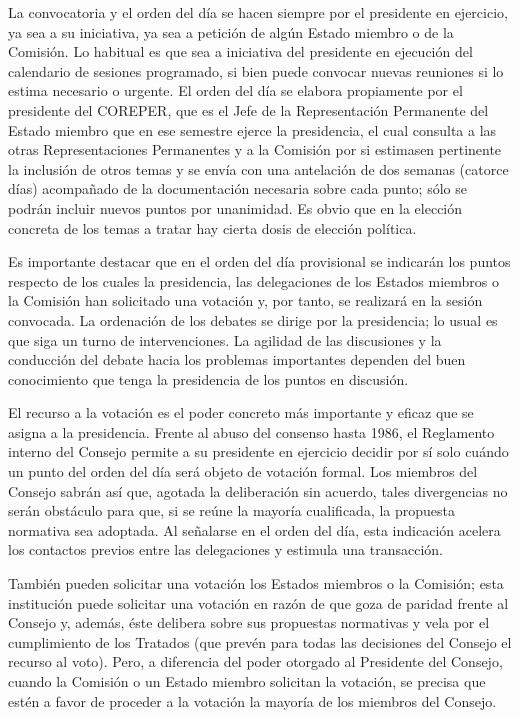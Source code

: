 \documentclass[10pt,a4paper]{article}
\begin{document}
La convocatoria y el orden del día se hacen siempre por el presidente en ejercicio, ya sea a su iniciativa, ya sea a petición de algún Estado miembro o de la Comisión. Lo habitual es que sea a iniciativa del presidente en ejecución del calendario de sesiones programado, si bien puede convocar nuevas reuniones si lo estima necesario o urgente. El orden del día se elabora propiamente por el presidente del COREPER, que es el Jefe de la Representación Permanente del Estado miembro que en ese semestre ejerce la presidencia, el cual consulta a las otras Representaciones Permanentes y a la Comisión por si estimasen pertinente la inclusión de otros temas y se envía con una antelación de dos semanas (catorce días) acompañado de la documentación necesaria sobre cada punto; sólo se podrán incluir nuevos puntos por unanimidad. Es obvio que en la elección concreta de los temas a tratar hay cierta dosis de elección política.

Es importante destacar que en el orden del día provisional se indicarán los puntos respecto de los cuales la presidencia, las delegaciones de los Estados miembros o la Comisión han solicitado una votación y, por tanto, se realizará en la sesión convocada. La ordenación de los debates se dirige por la presidencia; lo usual es que siga un turno de intervenciones. La agilidad de las discusiones y la conducción del debate hacia los problemas importantes dependen del buen conocimiento que tenga la presidencia de los puntos en discusión.

El recurso a la votación es el poder concreto más importante y eficaz que se asigna a la presidencia. Frente al abuso del consenso hasta 1986, el Reglamento interno del Consejo permite a su presidente en ejercicio decidir por sí solo cuándo un punto del orden del día será objeto de votación formal. Los miembros del Consejo sabrán así que, agotada la deliberación sin acuerdo, tales divergencias no serán obstáculo para que, si se reúne la mayoría cualificada, la propuesta normativa sea adoptada. Al señalarse en el orden del día, esta indicación acelera los contactos previos entre las delegaciones y estimula una transacción. 

También pueden solicitar una votación los Estados miembros o la Comisión; esta institución puede solicitar una votación en razón de que goza de paridad frente al Consejo y, además, éste delibera sobre sus propuestas normativas y vela por el cumplimiento de los Tratados (que prevén para todas las decisiones del Consejo el recurso al voto). Pero, a diferencia del poder otorgado al Presidente del Consejo, cuando la Comisión o un Estado miembro solicitan la votación, se precisa que estén a favor de proceder a la votación la mayoría de los miembros del Consejo.
\end{document}
